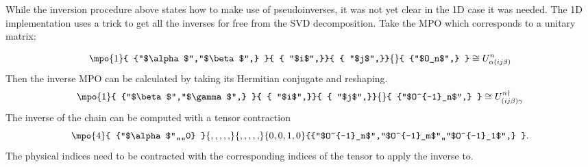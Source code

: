 

While the inversion procedure above states how to make use of pseudoinverses, it was not yet clear in the 1D case it was needed. The 1D implementation uses a trick to get all the inverses for free from the SVD decomposition. Take the MPO which corresponds to a unitary matrix:




\begin{equation}
    \mpo{1}{ {"$\alpha$","$\beta$",}  }{ { "$i$",}}{ { "$j$",}}{}{ {"$O_n$",} } \cong U^{n}_{\alpha (i j \beta)}
\end{equation}
Then the inverse MPO can be calculated by taking its Hermitian conjugate and reshaping.
\begin{equation}
    \mpo{1}{ {"$\beta$","$\gamma$",}  }{ { "$i$",}}{ { "$j$",}}{}{ {"$O^{-1}_n$",} } \cong U^{n \dagger}_{ (i j \beta)  \gamma }
\end{equation}
The inverse of the chain can be computed with a tensor contraction
\begin{equation}
    \mpo{4}{ {"$\alpha$",,,,0}  }{ {,,,,,}}{ { ,,,,,}}{{0,0,1,0}}{{"$O^{-1}_n$","$O^{-1}_m$",,"$O^{-1}_1$",} }.
\end{equation}
The physical indices need to be contracted with the corresponding indices of the tensor to apply the inverse to.

